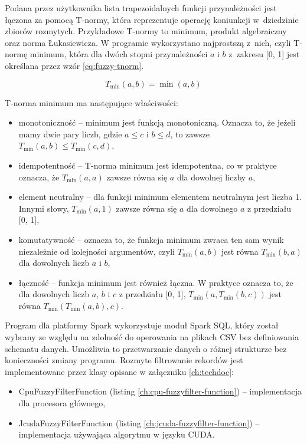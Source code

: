 Podana przez użytkownika lista trapezoidalnych funkcji przynależności jest łączona za pomocą T-normy,
która reprezentuje operację koniunkcji w~dziedzinie zbiorów rozmytych. Przykładowe T-normy to minimum,
produkt algebraiczny oraz norma Łukasiewicza. W programie wykorzystano najprostszą z~nich, czyli
T-normę minimum, która dla dwóch stopni przynależności \( a \) i \( b \) z~zakresu [0, 1] jest
określana przez wzór \ref{eq:fuzzy-tnorm}.

\begin{equation}
    T_{\text{min}}(a, b) = \min(a, b)
    \label{eq:fuzzy-tnorm}
\end{equation}

T-norma minimum ma następujące właściwości:
\begin{itemize}
    \item monotoniczność -- minimum jest funkcją monotoniczną. Oznacza to, że jeżeli mamy dwie pary liczb,
          gdzie \( a \leq c \) i \( b \leq d \), to zawsze \( T_{\text{min}}(a, b) \leq T_{\text{min}}(c, d) \),
    \item idempotentność -- T-norma minimum jest idempotentna, co w praktyce oznacza, że \( T_{\text{min}}(a, a) \)
          zawsze równa się \( a \) dla dowolnej liczby \( a \),
    \item element neutralny --  dla funkcji minimum elementem neutralnym jest liczba 1. Innymi słowy,
          \( T_{\text{min}}(a, 1) \) zawsze równa się \( a \) dla dowolnego \( a \) z przedziału [0, 1],
    \item komutatywność -- oznacza to, że funkcja minimum zwraca ten sam wynik niezależnie od kolejności
          argumentów, czyli \( T_{\text{min}}(a, b) \) jest równa \( T_{\text{min}}(b, a) \)
          dla dowolnych liczb \( a \) i \( b \),
    \item łączność -- funkcja minimum jest również łączna. W praktyce oznacza to, że dla dowolnych
          liczb \( a \), \( b \) i \( c \) z przedziału [0, 1], \( T_{\text{min}}(a, T_{\text{min}}(b, c)) \)
          jest równa \( T_{\text{min}}(T_{\text{min}}(a, b), c) \).
\end{itemize}

Program dla platformy Spark wykorzystuje moduł Spark SQL, który został wybrany ze względu na zdolność
do operowania na plikach CSV bez definiowania schematu danych. Umożliwia to przetwarzanie danych o różnej
strukturze bez konieczności zmiany programu. Rozmyte filtrowanie rekordów jest implementowane przez klasy opisane w załączniku \ref{ch:techdoc}:
\begin{itemize}
    \item CpuFuzzyFilterFunction (listing \ref{ch:cpu-fuzzyfilter-function}) -- implementacja dla procesora głównego,
    \item JcudaFuzzyFilterFunction (listing \ref{ch:jcuda-fuzzyfilter-function}) -- implementacja używająca algorytmu w języku CUDA.
\end{itemize}

